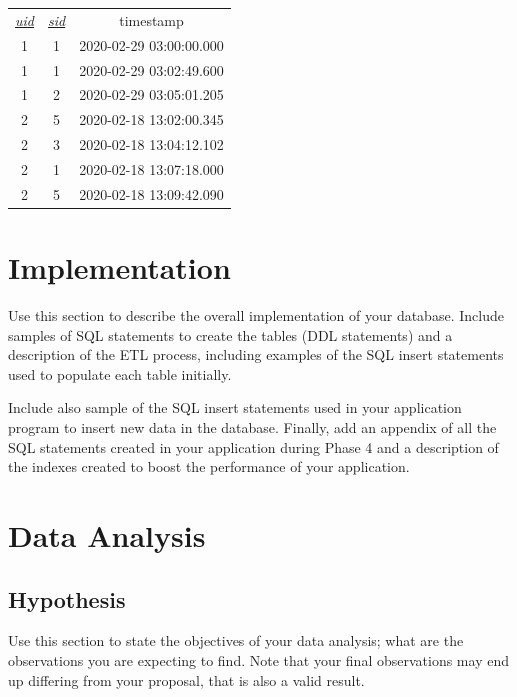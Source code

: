 \documentclass[12pt]{article}
\begin{document}
    \\~\\

    \begin{center}
        \begin{tabular}{ |c|c|c| }
            \hline
            \rowcolor{tablegrey} \multicolumn{3}{|c|}{Plays} \\
            \hline
            \underline{ \emph{uid} } & \underline{ \emph{sid} } & timestamp \\
            \hline
            1 & 1 & 2020-02-29 03:00:00.000 \\
            \hline
            1 & 1 & 2020-02-29 03:02:49.600 \\
            \hline
            1 & 2 & 2020-02-29 03:05:01.205 \\
            \hline
            2 & 5 & 2020-02-18 13:02:00.345 \\
            \hline
            2 & 3 & 2020-02-18 13:04:12.102 \\
            \hline
            2 & 1 & 2020-02-18 13:07:18.000 \\
            \hline
            2 & 5 & 2020-02-18 13:09:42.090 \\
            \hline
        \end{tabular}
    \end{center}



    \section{Implementation}
    Use this section to describe the overall implementation of your database. Include samples of SQL statements to create the tables (DDL statements) and a description of the ETL process, including examples of the SQL insert statements used to populate each table initially.

    Include also sample of the SQL insert statements used in your application program to insert new data in the database. Finally, add an appendix of all the SQL statements created in your application during Phase 4 and a description of the indexes created to boost the performance of your application.
    \section{Data Analysis}
    \subsection{Hypothesis}
    Use this section to state the objectives of your data analysis; what are the observations you are expecting to find. Note that your final
    observations may end up differing from your proposal, that is also a valid result.
\end{document}
